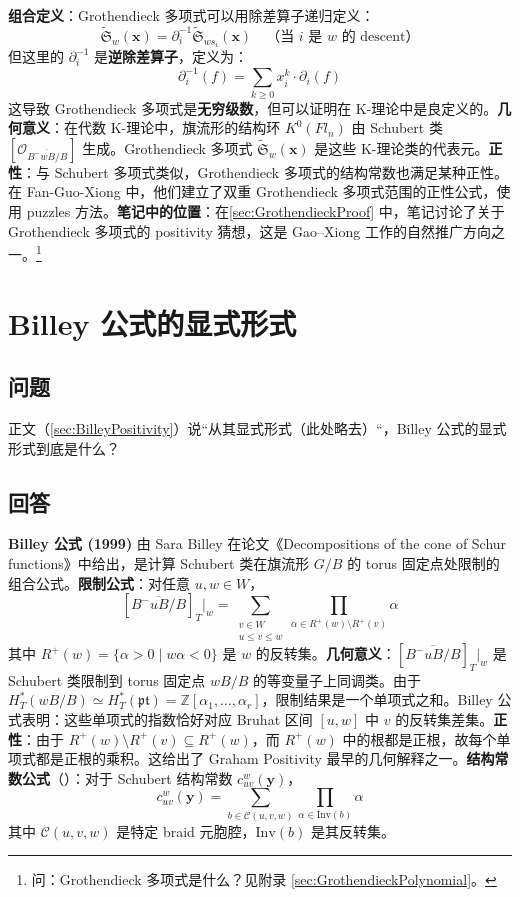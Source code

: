 \textbf{组合定义}：Grothendieck 多项式可以用除差算子递归定义：$$\widetilde{\mathfrak{S}}_w(\mathbf{x}) = \partial_i^{-1} \widetilde{\mathfrak{S}}_{ws_i}(\mathbf{x}) \quad \text{（当 } i \text{ 是 } w \text{ 的 descent）}$$但这里的 $\partial_i^{-1}$ 是\textbf{逆除差算子}，定义为：$$\partial_i^{-1}(f) = \sum_{k \geq 0} x_i^k \cdot \partial_i(f)$$这导致 Grothendieck 多项式是\textbf{无穷级数}，但可以证明在 K-理论中是良定义的。\textbf{几何意义}：在代数 K-理论中，旗流形的结构环 $K^0(Fl_n)$ 由 Schubert 类 $[\mathcal{O}_{\overline{B^-wB/B}}]$ 生成。Grothendieck 多项式 $\widetilde{\mathfrak{S}}_w(\mathbf{x})$ 是这些 K-理论类的代表元。\textbf{正性}：与 Schubert 多项式类似，Grothendieck 多项式的结构常数也满足某种正性。在 Fan-Guo-Xiong \cite{FGL2025} 中，他们建立了双重 Grothendieck 多项式范围的正性公式，使用 puzzles 方法。\textbf{笔记中的位置}：在\cref{sec:GrothendieckProof} 中，笔记讨论了关于 Grothendieck 多项式的 positivity 猜想，这是 Gao--Xiong \cite{GX2025} 工作的自然推广方向之一。\footnote{问：Grothendieck 多项式是什么？见附录 \cref{sec:GrothendieckPolynomial}。}
\section{Billey 公式的显式形式}\label{sec:BilleyFormulaExplicit}
\subsection{问题}
正文（\cref{sec:BilleyPositivity}）说``从其显式形式（此处略去）``，Billey 公式的显式形式到底是什么？
\subsection{回答}
\textbf{Billey 公式 (1999)} 由 Sara Billey 在论文《Decompositions of the cone of Schur functions》中给出，是计算 Schubert 类在旗流形 $G/B$ 的 torus 固定点处限制的组合公式。\textbf{限制公式}：对任意 $u, w \in W$，$$[\overline{B^-uB/B}]_T|_w = \sum_{\substack{v \in W \\ u \leq v \leq w}} \prod_{\alpha \in R^+(w) \setminus R^+(v)} \alpha$$其中 $R^+(w) = \{\alpha > 0 \mid w\alpha < 0\}$ 是 $w$ 的反转集。\textbf{几何意义}：$[\overline{B^-uB/B}]_T|_w$ 是 Schubert 类限制到 torus 固定点 $wB/B$ 的等变量子上同调类。由于 $H_T^*(wB/B) \simeq H_T^*(\mathfrak{pt}) = \mathbb{Z}[\alpha_1, \ldots, \alpha_r]$，限制结果是一个单项式之和。Billey 公式表明：这些单项式的指数恰好对应 Bruhat 区间 $[u,w]$ 中 $v$ 的反转集差集。\textbf{正性}：由于 $R^+(w) \setminus R^+(v) \subseteq R^+(w)$，而 $R^+(w)$ 中的根都是正根，故每个单项式都是正根的乘积。这给出了 Graham Positivity 最早的几何解释之一。\textbf{结构常数公式}（\cite[Corollary 4.3]{billey1999}）：对于 Schubert 结构常数 $c^w_{uv}(\mathbf{y})$，$$c^w_{uv}(\mathbf{y}) = \sum_{b \in \mathcal{C}(u,v,w)} \prod_{\alpha \in \text{Inv}(b)} \alpha$$其中 $\mathcal{C}(u,v,w)$ 是特定 braid 元胞腔，$\text{Inv}(b)$ 是其反转集。
